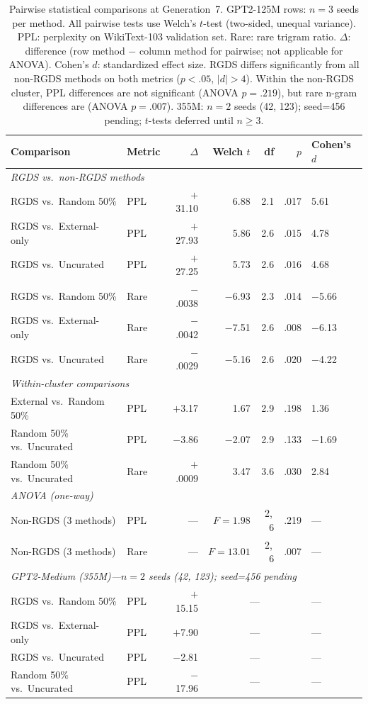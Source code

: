 \begin{table}[t]
\centering
\small
\begin{tabular}{llrrrrl}
\toprule
Comparison & Metric & $\Delta$ & Welch $t$ & df & $p$ & Cohen's $d$ \\
\midrule
\multicolumn{7}{l}{\textit{RGDS vs.\ non-RGDS methods}} \\
RGDS vs.\ Random 50\% & PPL & $+$31.10 & 6.88 & 2.1 & .017 & 5.61 \\
RGDS vs.\ External-only & PPL & $+$27.93 & 5.86 & 2.6 & .015 & 4.78 \\
RGDS vs.\ Uncurated & PPL & $+$27.25 & 5.73 & 2.6 & .016 & 4.68 \\
RGDS vs.\ Random 50\% & Rare & $-$.0038 & $-$6.93 & 2.3 & .014 & $-$5.66 \\
RGDS vs.\ External-only & Rare & $-$.0042 & $-$7.51 & 2.6 & .008 & $-$6.13 \\
RGDS vs.\ Uncurated & Rare & $-$.0029 & $-$5.16 & 2.6 & .020 & $-$4.22 \\
\midrule
\multicolumn{7}{l}{\textit{Within-cluster comparisons}} \\
External vs.\ Random 50\% & PPL & $+$3.17 & 1.67 & 2.9 & .198 & 1.36 \\
Random 50\% vs.\ Uncurated & PPL & $-$3.86 & $-$2.07 & 2.9 & .133 & $-$1.69 \\
Random 50\% vs.\ Uncurated & Rare & $+$.0009 & 3.47 & 3.6 & .030 & 2.84 \\
\midrule
\multicolumn{7}{l}{\textit{ANOVA (one-way)}} \\
Non-RGDS (3 methods) & PPL & --- & $F{=}1.98$ & 2,\,6 & .219 & --- \\
Non-RGDS (3 methods) & Rare & --- & $F{=}13.01$ & 2,\,6 & .007 & --- \\
\midrule
\multicolumn{7}{l}{\textit{GPT2-Medium (355M)---$n{=}2$ seeds (42, 123); seed=456 pending}} \\
RGDS vs.\ Random 50\% & PPL & $+$15.15 & \multicolumn{3}{c}{---} & --- \\
RGDS vs.\ External-only & PPL & $+$7.90 & \multicolumn{3}{c}{---} & --- \\
RGDS vs.\ Uncurated & PPL & $-$2.81 & \multicolumn{3}{c}{---} & --- \\
Random 50\% vs.\ Uncurated & PPL & $-$17.96 & \multicolumn{3}{c}{---} & --- \\
\bottomrule
\end{tabular}
\caption{Pairwise statistical comparisons at Generation~7. GPT2-125M rows: $n{=}3$ seeds per method. All pairwise tests use Welch's $t$-test (two-sided, unequal variance). PPL: perplexity on WikiText-103 validation set. Rare: rare trigram ratio. $\Delta$: difference (row method $-$ column method for pairwise; not applicable for ANOVA). Cohen's $d$: standardized effect size. RGDS differs significantly from all non-RGDS methods on both metrics ($p < .05$, $|d| > 4$). Within the non-RGDS cluster, PPL differences are not significant (ANOVA $p = .219$), but rare n-gram differences are (ANOVA $p = .007$). 355M: $n{=}2$ seeds (42, 123); seed=456 pending; $t$-tests deferred until $n \geq 3$.}
\label{tab:stat_tests}
\end{table}

